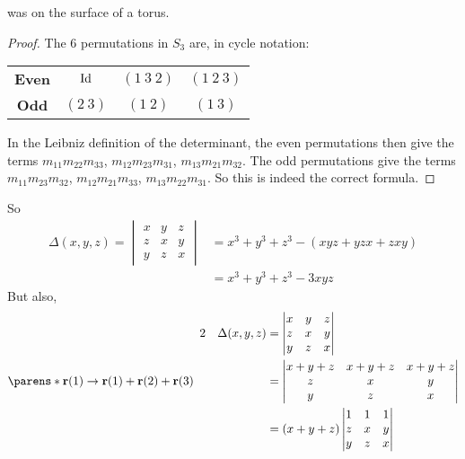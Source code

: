 \documentclass[fleqn,a4paper,11pt]{article}
\begin{document}
\begin{enumerate}[label=\textbf{\arabic*.}]
\begin{lemma}
    was on the surface of a torus.
   \end{lemma}
   \begin{proof}
    The 6 permutations in \(S_3\) are, in cycle notation:
    \begin{center}
     \begin{tabular}{*4c}
      \bfseries Even & \(\operatorname{Id}\) & \((1\ 3\ 2)\) & \((1\ 2\ 3)\) \\
      \bfseries Odd & \((2\ 3)\) & \((1\ 2)\) & \((1\ 3)\)
     \end{tabular}
    \end{center}
    In the Leibniz definition of the determinant, the even permutations
    then give the terms
    \({m_{11} m_{22} m_{33}}\),
    \({m_{12} m_{23} m_{31}}\),
    \({m_{13} m_{21} m_{32}}\).
    The odd permutations give the terms
    \(m_{11} m_{23} m_{32}\),
    \(m_{12} m_{21} m_{33}\),
    \(m_{13} m_{22} m_{31}\). So this is indeed the correct formula.
   \end{proof}
   So
   \begin{align*}
    \Delta(x, y, z) =
    \begin{vmatrix}
     x & y & z \\
     z & x & y \\
     y & z & x
    \end{vmatrix}
     &= x^3 + y^3 + z^3 - (xyz + yzx + zxy) \\
     &= x^3 + y^3 + z^3 - 3xyz
   \end{align*}
   But also,
   \begin{alignat*}2
    && \Delta(x, y, z) &= \begin{vmatrix}
     x & y & z \\
     z & x & y \\
     y & z & x
    \end{vmatrix} \\
    \parens*{
     \vec r(1) \to \vec r(1) + \vec r(2) + \vec r(3)
    } \quad
    && &= \begin{vmatrix}
     x + y + z & x + y + z & x + y + z \\
     z & x & y \\
     y & z & x
    \end{vmatrix} \\
    && &= (x + y + z)\begin{vmatrix}
     1 & 1 & 1 \\
     z & x & y \\
     y & z & x
    \end{vmatrix} \\

\end{alignat*}
\end{enumerate}
\end{document}
